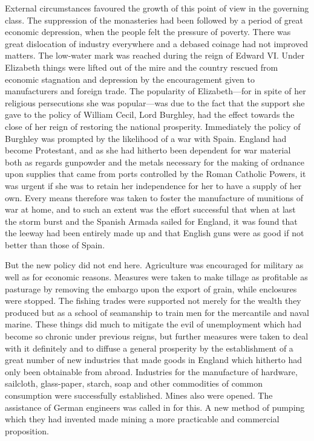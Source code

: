\documentclass{book}
\begin{document}
External circumstances favoured the growth of this point of view in the governing class. The suppression of the monasteries had been followed by a period of great economic depression, when the people felt the pressure of poverty. There was great dislocation of industry everywhere and a debased coinage had not improved matters. The low-water mark was reached during the reign of Edward VI. Under Elizabeth things were lifted out of the mire and the country rescued from economic stagnation and depression by the encouragement given to manufacturers and foreign trade. The popularity of Elizabeth—for in spite of her religious persecutions she was popular—was due to the fact that the support she gave to the policy of William Cecil, Lord Burghley, had the effect towards the close of her reign of restoring the national prosperity. Immediately the policy of Burghley was prompted by the likelihood of a war with Spain. England had become Protestant, and as she had hitherto been dependent for war material both as regards gunpowder and the metals necessary for the making of ordnance upon supplies that came from ports controlled by the Roman Catholic Powers, it was urgent if she was to retain her independence for her to have a supply of her own. Every means therefore was taken to foster the manufacture of munitions of war at home, and to such an extent was the effort successful that when at last the storm burst and the Spanish Armada sailed for England, it was found that the leeway had been entirely made up and that English guns were as good if not better than those of Spain.

But the new policy did not end here. Agriculture was encouraged for military as well as for economic reasons. Measures were taken to make tillage as profitable as pasturage by removing the embargo upon the export of grain, while enclosures were stopped. The fishing trades were supported not merely for the wealth they produced but as a school of seamanship to train men for the mercantile and naval marine. These things did much to mitigate the evil of unemployment which had become so chronic under previous reigns, but further measures were taken to deal with it definitely and to diffuse a general prosperity by the establishment of a great number of new industries that made goods in England which hitherto had only been obtainable from abroad. Industries for the manufacture of hardware, sailcloth, glass-paper, starch, soap and other commodities of common consumption were successfully established. Mines also were opened. The assistance of German engineers was called in for this. A new method of pumping which they had invented made mining a more practicable and commercial proposition.
\end{document}
